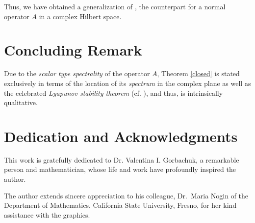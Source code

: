 \documentclass{amsart}
\theoremstyle{plain}
\theoremstyle{definition}
\begin{document}
Thus, we have obtained a generalization of {\cite[Proposition $5.1$]{Markin2001(1)}}, the counterpart for a normal operator $A$ in a complex Hilbert space.

\section{Concluding Remark}

Due to the {\it scalar type spectrality} of the operator $A$, Theorem \ref{closed} is stated exclusively in terms of the location of its {\it spectrum} in the complex plane as well as the celebrated \textit{Lyapunov stability theorem} \cite{Lyapunov1892} 
(cf. {\cite[Ch. I, Theorem 2.10]{Engel-Nagel}}),
and thus, is intrinsically qualitative.

\section{Dedication and Acknowledgments}

This work is gratefully dedicated to Dr. Valentina I. Gorbachuk, a remarkable person and mathematician, whose life and work have profoundly inspired the author. 

The author extends sincere appreciation to his colleague, Dr.~Maria Nogin of the Department of Mathematics, California State University, Fresno, for her kind assistance with the graphics.
\end{document}
